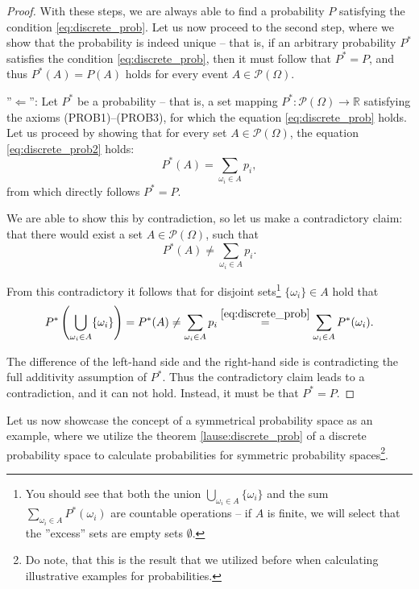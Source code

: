 \documentclass[12pt,a4paper,leqno]{report}
\newcommand{\R}{\mathbb{R}}
\theoremstyle{plain}
\theoremstyle{definition}
\begin{document}
\begin{proof}
With these steps, we are always able to find a probability $P$ satisfying the condition \ref{eq:discrete_prob}. Let us now proceed to the second step, where we show that the probability is indeed unique -- that is, if an arbitrary probability $P^*$ satisfies the condition \ref{eq:discrete_prob}, then it must follow that $P^* = P$, and thus $P^*(A) = P(A)$ holds for every event $A \in \mathcal{P}(\Omega)$.

\bigskip

''$\Leftarrow$'': Let $P^*$ be a probability -- that is, a set mapping $P^*:\mathcal{P}(\Omega) \rightarrow \R$ satisfying the axioms (PROB1)--(PROB3), for which the equation \ref{eq:discrete_prob} holds. Let us proceed by showing that for every set $A \in \mathcal{P}(\Omega)$, the equation \ref{eq:discrete_prob2} holds: 
\[
P^*(A) = \sum_{\omega_i \in A} p_i,
\]
from which directly follows $P^*=P$.

\bigskip

We are able to show this by contradiction, so let us make a contradictory claim: that there would exist a set $A \in \mathcal{P}(\Omega)$, such that
 \[
P^*(A) \neq \sum_{\omega_i \in A} p_i.
\]

From this contradictory it follows that for disjoint sets\footnote{You should see that both the union $\bigcup_{\omega_i \in A} \{\omega_i\}$ and the sum $\sum_{\omega_i \in A} P^*(\omega_i)$ are countable operations -- if $A$ is finite, we will select that the ''excess'' sets are empty sets $\emptyset$.} $\{\omega_i\} \in A$ hold that
\[
P^*\left(\bigcup_{\omega_i \in A} \{\omega_i\} \right) = P^*(A) \neq \sum_{\omega_i \in A} p_i \overset{\ref{eq:discrete_prob}}{=} \sum_{\omega_i \in A} P^*(\omega_i).
\]

The difference of the left-hand side and the right-hand side is contradicting the full additivity assumption of $P^*$. Thus the contradictory claim leads to a contradiction, and it can not hold. Instead, it must be that $P^* = P$. 
\end{proof}

Let us now showcase the concept of a symmetrical probability space as an example, where we utilize the theorem \ref{lause:discrete_prob} of a discrete probability space to calculate probabilities for symmetric probability spaces\footnote{Do note, that this is the result that we utilized before when calculating illustrative examples for probabilities.}.
\end{document}
